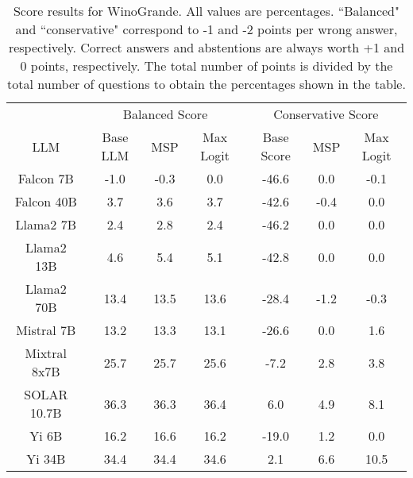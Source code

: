 \renewcommand\arraystretch{1.2}
\begin{table*}
\centering
\begin{tabular}{c|c|c|c|c|c|c}
& \multicolumn{3}{c|}{Balanced Score} & \multicolumn{3}{c}{Conservative Score} \\ 
LLM & Base LLM & MSP & Max Logit & Base Score & MSP & Max Logit\\ \hline
Falcon 7B & -1.0 & -0.3 & 0.0 & -46.6 & 0.0 & -0.1\\
Falcon 40B & 3.7 & 3.6 & 3.7 & -42.6 & -0.4 & 0.0\\
Llama2 7B & 2.4 & 2.8 & 2.4 & -46.2 & 0.0 & 0.0\\
Llama2 13B & 4.6 & 5.4 & 5.1 & -42.8 & 0.0 & 0.0\\
Llama2 70B & 13.4 & 13.5 & 13.6 & -28.4 & -1.2 & -0.3\\
Mistral 7B & 13.2 & 13.3 & 13.1 & -26.6 & 0.0 & 1.6\\
Mixtral 8x7B & 25.7 & 25.7 & 25.6 & -7.2 & 2.8 & 3.8\\
SOLAR 10.7B & 36.3 & 36.3 & 36.4 & 6.0 & 4.9 & 8.1\\
Yi 6B & 16.2 & 16.6 & 16.2 & -19.0 & 1.2 & 0.0\\
Yi 34B & 34.4 & 34.4 & 34.6 & 2.1 & 6.6 & 10.5\\
\hline
\end{tabular}
\caption{Score results for WinoGrande. All values are percentages. ``Balanced" and ``conservative" correspond to -1 and -2 points per wrong answer, respectively. Correct answers and abstentions are always worth +1 and 0 points, respectively. The total number of points is divided by the total number of questions to obtain the percentages shown in the table.}
\label{tab:winogrande_score}
\end{table*}
